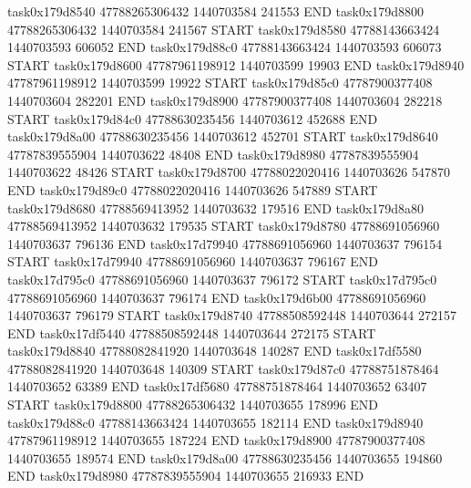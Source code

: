 task0x179d8540 47788265306432          1440703584               241553  END
task0x179d8800 47788265306432          1440703584               241567  START
task0x179d8580 47788143663424          1440703593               606052  END
task0x179d88c0 47788143663424          1440703593               606073  START
task0x179d8600 47787961198912          1440703599                19903  END
task0x179d8940 47787961198912          1440703599                19922  START
task0x179d85c0 47787900377408          1440703604               282201  END
task0x179d8900 47787900377408          1440703604               282218  START
task0x179d84c0 47788630235456          1440703612               452688  END
task0x179d8a00 47788630235456          1440703612               452701  START
task0x179d8640 47787839555904          1440703622                48408  END
task0x179d8980 47787839555904          1440703622                48426  START
task0x179d8700 47788022020416          1440703626               547870  END
task0x179d89c0 47788022020416          1440703626               547889  START
task0x179d8680 47788569413952          1440703632               179516  END
task0x179d8a80 47788569413952          1440703632               179535  START
task0x179d8780 47788691056960          1440703637               796136  END
task0x17d79940 47788691056960          1440703637               796154  START
task0x17d79940 47788691056960          1440703637               796167  END
task0x17d795c0 47788691056960          1440703637               796172  START
task0x17d795c0 47788691056960          1440703637               796174  END
task0x179d6b00 47788691056960          1440703637               796179  START
task0x179d8740 47788508592448          1440703644               272157  END
task0x17df5440 47788508592448          1440703644               272175  START
task0x179d8840 47788082841920          1440703648               140287  END
task0x17df5580 47788082841920          1440703648               140309  START
task0x179d87c0 47788751878464          1440703652                63389  END
task0x17df5680 47788751878464          1440703652                63407  START
task0x179d8800 47788265306432          1440703655               178996  END
task0x179d88c0 47788143663424          1440703655               182114  END
task0x179d8940 47787961198912          1440703655               187224  END
task0x179d8900 47787900377408          1440703655               189574  END
task0x179d8a00 47788630235456          1440703655               194860  END
task0x179d8980 47787839555904          1440703655               216933  END
